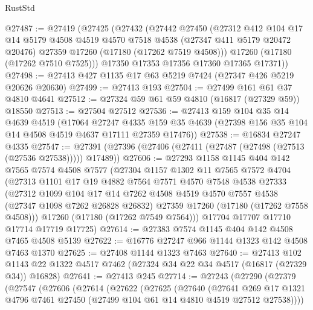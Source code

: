 \begin{lexlean}{RustStd}
\begin{coremodule}
@27487 := @27419
    (@27425
      (@27432
        (@27442
          @27450
          (@27312
            @412
            @104
            @17
            @14
            @5179
            @4508
            @4519
            @4570
            @7518
            @4538
            (@27347 @411 @5179 @20472 @20476)
            @27359
            @17260
            (@17180 (@17262 @7519 @4508)))
          @17260
          (@17180 (@17262 @7510 @7525)))
        @17350
        @17353
        @17356
        @17360
        @17365
        @17371))
@27498 := @27413 @427 @1135 @17 @63 @5219 @7424 (@27347 @426 @5219 @20626 @20630)
@27499 := @27413 @193
@27504 := @27499 @161 @61 @37 @4810 @4641
@27512 := @27324 @59 @61 @59 @4810 (@16817 (@27329 @59)) @18550
@27513 := @27504 @27512
@27536 := @27413
    @159
    @104
    @35
    @14
    @4639
    @4519
    (@17064
      @27247
      @4335
      @159
      @35
      @4639
      (@27398 @156 @35 @104 @14 @4508 @4519 @4637 @17111 @27359 @17476))
@27538 := @16834 @27247 @4335
@27547 := @27391 (@27396 (@27406 (@27411 (@27487 (@27498 (@27513 (@27536 @27538))))) @17489))
@27606 := @27293
    @1158
    @1145
    @404
    @142
    @7565
    @7574
    @4508
    @7577
    (@27304
      @1157
      @1302
      @11
      @7565
      @7572
      @4704
      (@27313
        @1101
        @17
        @19
        @4882
        @7564
        @7571
        @4570
        @7548
        @4538
        @27333
        (@27312
          @1099
          @104
          @17
          @14
          @7262
          @4508
          @4519
          @4570
          @7557
          @4538
          (@27347 @1098 @7262 @26828 @26832)
          @27359
          @17260
          (@17180 (@17262 @7558 @4508)))
        @17260
        (@17180 (@17262 @7549 @7564)))
      @17704
      @17707
      @17710
      @17714
      @17719
      @17725)
@27614 := @27383 @7574 @1145 @404 @142 @4508 @7465 @4508 @5139
@27622 := @16776 @27247 @966 @1144 @1323 @142 @4508 @7463 @1370
@27625 := @27408 @1144 @1323 @7463
@27640 := @27413
    @102
    @1143
    @22
    @1322
    @4517
    @7462
    (@27324 @34 @22 @34 @4517 (@16817 (@27329 @34)) @16828)
@27641 := @27413 @245
@27714 := @27243
    (@27290
      (@27379
        (@27547
          (@27606
            (@27614
              (@27622
                (@27625
                  (@27640
                    (@27641
                      @269
                      @17
                      @1321
                      @4796
                      @7461
                      @27450
                      (@27499 @104 @61 @14 @4810 @4519 @27512 @27538))))

\end{coremodule}
\end{lexlean}
